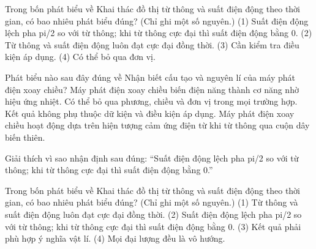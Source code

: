 \begin{ex}
Trong bốn phát biểu về Khai thác đồ thị từ thông và suất điện động theo thời gian, có bao nhiêu phát biểu đúng? (Chỉ ghi một số nguyên.) (1) Suất điện động lệch pha pi/2 so với từ thông; khi từ thông cực đại thì suất điện động bằng 0. (2) Từ thông và suất điện động luôn đạt cực đại đồng thời. (3) Cần kiểm tra điều kiện áp dụng. (4) Có thể bỏ qua đơn vị.
\end{ex}

\begin{ex}
Phát biểu nào sau đây đúng về Nhận biết cấu tạo và nguyên lí của máy phát điện xoay chiều?
\choice
{Máy phát điện xoay chiều biến điện năng thành cơ năng nhờ hiệu ứng nhiệt.}
{Có thể bỏ qua phương, chiều và đơn vị trong mọi trường hợp.}
{Kết quả không phụ thuộc dữ kiện và điều kiện áp dụng.}
{\True Máy phát điện xoay chiều hoạt động dựa trên hiện tượng cảm ứng điện từ khi từ thông qua cuộn dây biến thiên.}
\end{ex}

\begin{bt}
Giải thích vì sao nhận định sau đúng: “Suất điện động lệch pha pi/2 so với từ thông; khi từ thông cực đại thì suất điện động bằng 0.”
\end{bt}

\begin{ex}
Trong bốn phát biểu về Khai thác đồ thị từ thông và suất điện động theo thời gian, có bao nhiêu phát biểu đúng? (Chỉ ghi một số nguyên.) (1) Từ thông và suất điện động luôn đạt cực đại đồng thời. (2) Suất điện động lệch pha pi/2 so với từ thông; khi từ thông cực đại thì suất điện động bằng 0. (3) Kết quả phải phù hợp ý nghĩa vật lí. (4) Mọi đại lượng đều là vô hướng.
\end{ex}

